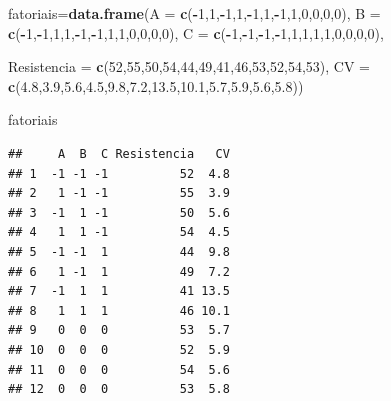 \documentclass[
]{article}
\newenvironment{Shaded}{\begin{snugshade}}{\end{snugshade}}
\newcommand{\AttributeTok}[1]{\textcolor[rgb]{0.13,0.29,0.53}{#1}}
\newcommand{\DecValTok}[1]{\textcolor[rgb]{0.00,0.00,0.81}{#1}}
\newcommand{\FloatTok}[1]{\textcolor[rgb]{0.00,0.00,0.81}{#1}}
\newcommand{\FunctionTok}[1]{\textcolor[rgb]{0.13,0.29,0.53}{\textbf{#1}}}
\newcommand{\NormalTok}[1]{#1}
\newcommand{\OtherTok}[1]{\textcolor[rgb]{0.56,0.35,0.01}{#1}}
\newcommand{\SpecialCharTok}[1]{\textcolor[rgb]{0.81,0.36,0.00}{\textbf{#1}}}
\begin{document}
\begin{Shaded}
\begin{Highlighting}[]
\NormalTok{fatoriais}\OtherTok{=}\FunctionTok{data.frame}\NormalTok{(}\AttributeTok{A =} \FunctionTok{c}\NormalTok{(}\SpecialCharTok{{-}}\DecValTok{1}\NormalTok{,}\DecValTok{1}\NormalTok{,}\SpecialCharTok{{-}}\DecValTok{1}\NormalTok{,}\DecValTok{1}\NormalTok{,}\SpecialCharTok{{-}}\DecValTok{1}\NormalTok{,}\DecValTok{1}\NormalTok{,}\SpecialCharTok{{-}}\DecValTok{1}\NormalTok{,}\DecValTok{1}\NormalTok{,}\DecValTok{0}\NormalTok{,}\DecValTok{0}\NormalTok{,}\DecValTok{0}\NormalTok{,}\DecValTok{0}\NormalTok{),}
                     \AttributeTok{B =} \FunctionTok{c}\NormalTok{(}\SpecialCharTok{{-}}\DecValTok{1}\NormalTok{,}\SpecialCharTok{{-}}\DecValTok{1}\NormalTok{,}\DecValTok{1}\NormalTok{,}\DecValTok{1}\NormalTok{,}\SpecialCharTok{{-}}\DecValTok{1}\NormalTok{,}\SpecialCharTok{{-}}\DecValTok{1}\NormalTok{,}\DecValTok{1}\NormalTok{,}\DecValTok{1}\NormalTok{,}\DecValTok{0}\NormalTok{,}\DecValTok{0}\NormalTok{,}\DecValTok{0}\NormalTok{,}\DecValTok{0}\NormalTok{),}
                     \AttributeTok{C =} \FunctionTok{c}\NormalTok{(}\SpecialCharTok{{-}}\DecValTok{1}\NormalTok{,}\SpecialCharTok{{-}}\DecValTok{1}\NormalTok{,}\SpecialCharTok{{-}}\DecValTok{1}\NormalTok{,}\SpecialCharTok{{-}}\DecValTok{1}\NormalTok{,}\DecValTok{1}\NormalTok{,}\DecValTok{1}\NormalTok{,}\DecValTok{1}\NormalTok{,}\DecValTok{1}\NormalTok{,}\DecValTok{0}\NormalTok{,}\DecValTok{0}\NormalTok{,}\DecValTok{0}\NormalTok{,}\DecValTok{0}\NormalTok{),}

\AttributeTok{Resistencia =} \FunctionTok{c}\NormalTok{(}\DecValTok{52}\NormalTok{,}\DecValTok{55}\NormalTok{,}\DecValTok{50}\NormalTok{,}\DecValTok{54}\NormalTok{,}\DecValTok{44}\NormalTok{,}\DecValTok{49}\NormalTok{,}\DecValTok{41}\NormalTok{,}\DecValTok{46}\NormalTok{,}\DecValTok{53}\NormalTok{,}\DecValTok{52}\NormalTok{,}\DecValTok{54}\NormalTok{,}\DecValTok{53}\NormalTok{),}
\AttributeTok{CV =} \FunctionTok{c}\NormalTok{(}\FloatTok{4.8}\NormalTok{,}\FloatTok{3.9}\NormalTok{,}\FloatTok{5.6}\NormalTok{,}\FloatTok{4.5}\NormalTok{,}\FloatTok{9.8}\NormalTok{,}\FloatTok{7.2}\NormalTok{,}\FloatTok{13.5}\NormalTok{,}\FloatTok{10.1}\NormalTok{,}\FloatTok{5.7}\NormalTok{,}\FloatTok{5.9}\NormalTok{,}\FloatTok{5.6}\NormalTok{,}\FloatTok{5.8}\NormalTok{))}

\NormalTok{fatoriais}
\end{Highlighting}
\end{Shaded}

\begin{verbatim}
##     A  B  C Resistencia   CV
## 1  -1 -1 -1          52  4.8
## 2   1 -1 -1          55  3.9
## 3  -1  1 -1          50  5.6
## 4   1  1 -1          54  4.5
## 5  -1 -1  1          44  9.8
## 6   1 -1  1          49  7.2
## 7  -1  1  1          41 13.5
## 8   1  1  1          46 10.1
## 9   0  0  0          53  5.7
## 10  0  0  0          52  5.9
## 11  0  0  0          54  5.6
## 12  0  0  0          53  5.8
\end{verbatim}
\end{document}
